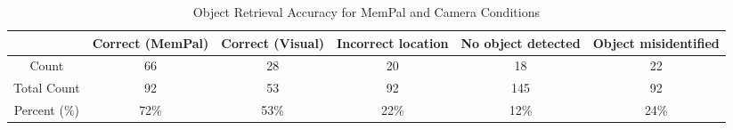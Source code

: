 \begin{table*}
    \centering
    \begin{tabular}{cccccc}
        \toprule
        \textbf{} & \textbf{Correct (MemPal)} & \textbf{Correct (Visual)} & \textbf{Incorrect location} & \textbf{No object detected} & \textbf{Object misidentified}\\
        \midrule
        Count & 66 & 28 & 20 & 18 & 22 \\
        Total Count & 92 & 53 & 92 & 145 & 92 \\
        Percent ($\%$) & 72\% & 53\% & 22\% & 12\% & 24\% \\
        \midrule
        \bottomrule
    \end{tabular}
    \caption{Object Retrieval Accuracy for MemPal and Camera Conditions}
    \label{tab:objectacc}
\end{table*}
